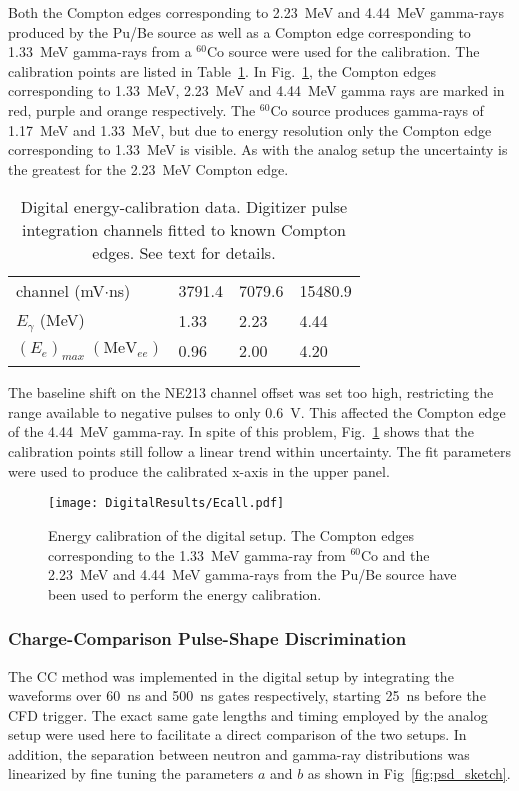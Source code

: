\documentclass[main.tex]{subfiles}
\begin{document}
Both the Compton edges corresponding to \SI{2.23}{\MeV} and \SI{4.44}{\MeV} gamma-rays produced by the Pu/Be source as well as a Compton edge corresponding to \SI{1.33}{MeV} gamma-rays from a $^{60}$Co source were used for the calibration. The calibration points are listed in Table~\ref{tab:knox_d}. In Fig.~\ref{fig:D_QDC}, the Compton edges corresponding to \SI{1.33}{\MeV}, \SI{2.23}{\MeV} and \SI{4.44}{\MeV} gamma rays are marked in red, purple and orange respectively. The $^{60}$Co source produces gamma-rays of \SI{1.17}{\MeV} and \SI{1.33}{\MeV}, but due to energy resolution only the Compton edge corresponding to \SI{1.33}{MeV} is visible.  As with the analog setup the uncertainty is the greatest for the \SI{2.23}{\MeV} Compton edge.
\begin{table}[hb]
	\center
	\begin{tabular}{|l|l|l|l|}
	\hline
	channel (mV$\cdot$ns)            & 3791.4 & 7079.6  & 15480.9  \\ \hhline{|=|=|=|=|}
	$E_\gamma$ (MeV)          & 1.33    & 2.23  & 4.44 \\
	\hline
	$(E_{e})_{max}\; (\textrm{MeV}_{ee})$ & 0.96    & 2.00  & 4.20 \\
	\hline
	\end{tabular}
	\caption[Digital energy-calibration data.]{Digital energy-calibration data. Digitizer pulse integration channels fitted to known Compton edges. See text for details.}
	\label{tab:knox_d}
\end{table}
The baseline shift on the NE213 channel offset was set too high, restricting the range available to negative pulses to only \SI{0.6}{V}. This affected the Compton edge of the \SI{4.44}{\MeV} gamma-ray. In spite of this problem, Fig.~\ref{fig:D_QDC} shows that the calibration points still follow a linear trend within uncertainty. The fit parameters were used to produce the calibrated x-axis in the upper panel.

\begin{figure}[ht]
    \centering
        \texttt{[image: DigitalResults/Ecall.pdf]}
        \caption[Energy calibration of the digital setup.]{Energy calibration of the digital setup. The Compton edges corresponding to the \SI{1.33}{\MeV} gamma-ray from $^{60}$Co and the \SI{2.23}{\MeV} and \SI{4.44}{\MeV} gamma-rays from the Pu/Be source have been used to perform the energy calibration.}
    \label{fig:D_QDC}
\end{figure}

\subsubsection{Charge-Comparison Pulse-Shape Discrimination}
The CC method was implemented in the digital setup by integrating the waveforms over \SI{60}{ns} and \SI{500}{ns} gates respectively, starting \SI{25}{ns} before the CFD trigger. The exact same gate lengths and timing employed by the analog setup were used here to facilitate a direct comparison of the two setups. In addition, the separation between neutron and gamma-ray distributions was linearized by fine tuning the parameters $a$ and $b$ as shown in Fig~\ref{fig:psd_sketch}.
\end{document}
